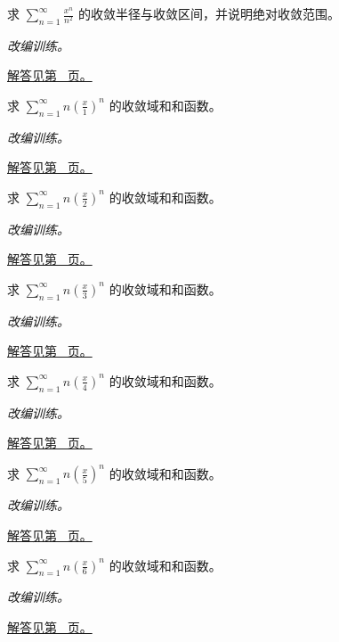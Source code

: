 \documentclass[UTF8,12pt,a4paper,fontset=fandol]{ctexart}
\begin{document}
\begin{example}[交错幂级数的端点]\label{ex:c26q7}
求 $\displaystyle\sum_{n=1}^\infty\frac{x^n}{n^{2}}$ 的收敛半径与收敛区间，并说明绝对收敛范围。
\par\textit{改编训练。}\par\hyperref[ans:c26q7]{解答见第~\pageref{ans:c26q7} 页。}
\end{example}
\begin{example}[几何级数导出的和函数]\label{ex:c26q8}
求 $\displaystyle\sum_{n=1}^\infty n\left(\frac x{1}\right)^n$ 的收敛域和和函数。
\par\textit{改编训练。}\par\hyperref[ans:c26q8]{解答见第~\pageref{ans:c26q8} 页。}
\end{example}
\begin{example}[几何级数导出的和函数]\label{ex:c26q9}
求 $\displaystyle\sum_{n=1}^\infty n\left(\frac x{2}\right)^n$ 的收敛域和和函数。
\par\textit{改编训练。}\par\hyperref[ans:c26q9]{解答见第~\pageref{ans:c26q9} 页。}
\end{example}
\begin{example}[几何级数导出的和函数]\label{ex:c26q10}
求 $\displaystyle\sum_{n=1}^\infty n\left(\frac x{3}\right)^n$ 的收敛域和和函数。
\par\textit{改编训练。}\par\hyperref[ans:c26q10]{解答见第~\pageref{ans:c26q10} 页。}
\end{example}
\begin{example}[几何级数导出的和函数]\label{ex:c26q11}
求 $\displaystyle\sum_{n=1}^\infty n\left(\frac x{4}\right)^n$ 的收敛域和和函数。
\par\textit{改编训练。}\par\hyperref[ans:c26q11]{解答见第~\pageref{ans:c26q11} 页。}
\end{example}
\begin{example}[几何级数导出的和函数]\label{ex:c26q12}
求 $\displaystyle\sum_{n=1}^\infty n\left(\frac x{5}\right)^n$ 的收敛域和和函数。
\par\textit{改编训练。}\par\hyperref[ans:c26q12]{解答见第~\pageref{ans:c26q12} 页。}
\end{example}
\begin{example}[几何级数导出的和函数]\label{ex:c26q13}
求 $\displaystyle\sum_{n=1}^\infty n\left(\frac x{6}\right)^n$ 的收敛域和和函数。
\par\textit{改编训练。}\par\hyperref[ans:c26q13]{解答见第~\pageref{ans:c26q13} 页。}
\end{example}
\end{document}
